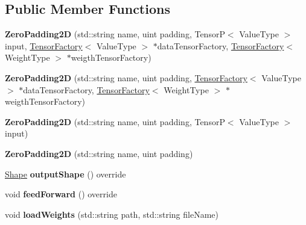 \subsection*{Public Member Functions}
\begin{DoxyCompactItemize}
\item 
\mbox{\label{classZeroPadding2D_a60ab0775e896e530af48533a3e17c689}} 
{\bfseries Zero\+Padding2D} (std\+::string name, uint padding, TensorP$<$ Value\+Type $>$ input, \hyperlink{classTensorFactory}{Tensor\+Factory}$<$ Value\+Type $>$ $\ast$data\+Tensor\+Factory, \hyperlink{classTensorFactory}{Tensor\+Factory}$<$ Weight\+Type $>$ $\ast$weigth\+Tensor\+Factory)
\item 
\mbox{\label{classZeroPadding2D_a337936cbafd4d7de12d3ee83cf2e206d}} 
{\bfseries Zero\+Padding2D} (std\+::string name, uint padding, \hyperlink{classTensorFactory}{Tensor\+Factory}$<$ Value\+Type $>$ $\ast$data\+Tensor\+Factory, \hyperlink{classTensorFactory}{Tensor\+Factory}$<$ Weight\+Type $>$ $\ast$weigth\+Tensor\+Factory)
\item 
\mbox{\label{classZeroPadding2D_ab5b9cf645be4db0934e187cd7c106cd5}} 
{\bfseries Zero\+Padding2D} (std\+::string name, uint padding, TensorP$<$ Value\+Type $>$ input)
\item 
\mbox{\label{classZeroPadding2D_a751dcce114778af2fa14264df69d32f2}} 
{\bfseries Zero\+Padding2D} (std\+::string name, uint padding)
\item 
\mbox{\label{classZeroPadding2D_ad69fd55388647abe6da3fbd13276345f}} 
\hyperlink{classShape}{Shape} {\bfseries output\+Shape} () override
\item 
\mbox{\label{classZeroPadding2D_acea530d6eda8b20a8bbf2999fa8b2a2c}} 
void {\bfseries feed\+Forward} () override
\item 
\mbox{\label{classZeroPadding2D_a4ce4764406efbdb3e6682edb6514b3af}} 
void {\bfseries load\+Weights} (std\+::string path, std\+::string file\+Name)
\item 
\mbox{\label{classZeroPadding2D_a443b3a6de288bab8dc27e97ba838ebb7}} 

\end{DoxyCompactItemize}
